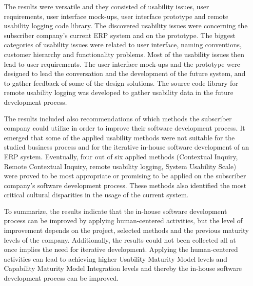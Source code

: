 \documentclass[12pt,a4paper,oneside,pdftex]{report}
\begin{document}
The results were versatile and they consisted of usability issues, user requirements, user interface mock-ups, user interface prototype and remote usability logging code library. The discovered usability issues were concerning the subscriber company's current ERP system and on the prototype. The biggest categories of usability issues were related to user interface, naming conventions, customer hierarchy and functionality problems. Most of the usability issues then lead to user requirements. The user interface mock-ups and the prototype were designed to lead the conversation and the development of the future system, and to gather feedback of some of the design solutions. The source code library for remote usability logging was developed to gather usability data in the future development process.  

The results included also recommendations of which methods the subscriber company could utilize in order to improve their software development process. It emerged that some of the applied usability methods were not suitable for the studied business process and for the iterative in-house software development of an ERP system. Eventually, four out of six applied methods (Contextual Inquiry, Remote Contextual Inquiry, remote usability logging, System Usability Scale) were proved to be most appropriate or promising to be applied on the subscriber company's software development process. These methods also identified the most critical cultural disparities in the usage of the current system.

To summarize, the results indicate that the in-house software development process can be improved by applying human-centered activities, but the level of improvement depends on the project, selected methods and the previous maturity levels of the company. Additionally, the results could not been collected all at once implies the need for iterative development. Applying the human-centered activities can lead to achieving higher Usability Maturity Model levels and Capability Maturity Model Integration levels and thereby the in-house software development process can be improved.   
\end{document}
